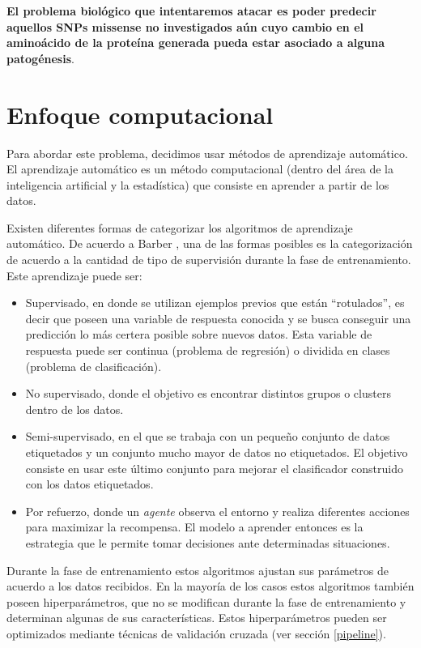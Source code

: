 \textbf{El problema biológico que intentaremos atacar es poder predecir aquellos SNPs missense no investigados aún cuyo cambio en el aminoácido de la proteína generada pueda estar asociado a alguna patogénesis}. 

\section{Enfoque computacional}

Para abordar este problema, decidimos usar métodos de aprendizaje automático. El aprendizaje automático es un método computacional (dentro del área de la inteligencia artificial y la estadística) que consiste en aprender a partir de los datos. 

Existen diferentes formas de categorizar los algoritmos de aprendizaje automático. De acuerdo a Barber \cite{Barber2011}, una de las formas posibles es la categorización de acuerdo a la cantidad de tipo de supervisión durante la fase de entrenamiento. Este aprendizaje puede ser:

\begin{itemize}
\item Supervisado, en donde se utilizan ejemplos previos que están ``rotulados'', es decir que poseen una variable de respuesta conocida y se busca conseguir una predicción lo más certera posible sobre nuevos datos. Esta variable de respuesta puede ser continua (problema de regresión) o dividida en clases (problema de clasificación). 
\item No supervisado, donde el objetivo es encontrar distintos grupos o clusters dentro de los datos.
\item Semi-supervisado, en el que se trabaja con un pequeño conjunto de datos etiquetados y un conjunto mucho mayor de datos no etiquetados. El objetivo consiste en usar este último conjunto para mejorar el clasificador construido con los datos etiquetados.
\item Por refuerzo, donde un \textit{agente} observa el entorno y realiza diferentes acciones para maximizar la recompensa. El modelo a aprender entonces es la estrategia que le permite tomar decisiones ante determinadas situaciones. 
\end{itemize}

Durante la fase de entrenamiento estos algoritmos ajustan sus parámetros de acuerdo a los datos recibidos. En la mayoría de los casos estos algoritmos también poseen hiperparámetros, que no se modifican durante la fase de entrenamiento y determinan algunas de sus características. Estos hiperparámetros pueden ser optimizados mediante técnicas de validación cruzada (ver sección \ref{pipeline}). 

